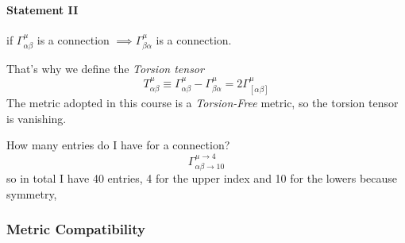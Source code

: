 \paragraph{Statement II} if $\Gamma ^{\mu }_{\alpha \beta }$ is a connection $\implies  \Gamma ^{\mu }_{\beta  \alpha }$ is a connection.\par
That's why we define the \emph{ Torsion tensor}
\[
	T^{\mu }_{\alpha \beta }\equiv \Gamma  ^{\mu }_{\alpha \beta } - \Gamma ^{\mu }_{\beta  \alpha } = 2 \Gamma ^{\mu }_{[\alpha \beta ]}
\]
The metric adopted in this course is a \emph{ Torsion-Free} metric, so the torsion tensor is vanishing.\par
How many entries do I have for a connection?
\[
\Gamma ^{\mu \to 4}_{\alpha \beta \to 10}
\]
so in total I have 40 entries, 4 for the upper index and 10 for the lowers because symmetry, \par
\subsubsection{Metric Compatibility}

